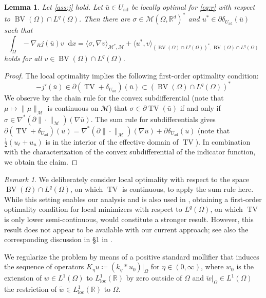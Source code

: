 \documentclass[11pt]{article}
\newcommand{\R}{\mathbb{R}}
\newcommand{\calM}{\mathcal{M}}
\DeclareMathOperator*{\BV}{BV}
\DeclareMathOperator*{\TV}{TV}
\newcommand*\dd{\mathop{}\!\mathrm{d}}
\newcommand{\feas}{U_{\textrm{ad}}}
\newtheorem{lemma}[theorem]{Lemma}
\theoremstyle{definition}
\theoremstyle{remark}
\newtheorem{remark}[theorem]{Remark}
\begin{document}
%
\begin{lemma}
Let \cref{ass:j} hold.
Let $\bar{u} \in \feas$ be locally optimal for \eqref{eq:r}
with respect to $\BV(\Omega) \cap L^{q}(\Omega)$.
Then there are $\sigma \in \calM(\Omega,\R^d)^*$
and $u^* \in \partial \delta_{\feas}(\bar{u})$ such that
%
\[ \int_{\Omega}-\nabla_R j(\bar{u}) v \dd x
= \langle \sigma, \nabla v\rangle_{\calM^*,\calM} 
+ \langle u^*, v \rangle_{(\BV(\Omega) \cap L^{q}(\Omega))^*,\BV(\Omega) \cap L^{q}(\Omega)}
\]
%
holds for all $v \in \BV(\Omega) \cap L^{q}(\Omega)$.
\end{lemma}
\begin{proof}
The local optimality implies the following first-order optimality condition:
%
\[ -j'(\bar{u}) \in \partial (\TV + \delta_{\feas})(\bar{u}) 
   \subset (\BV(\Omega) \cap L^{q}(\Omega))^*
\]
%
We observe by the chain rule for the convex subdifferential (note that $\mu \mapsto \|\mu\|_{\calM}$
is continuous on $\calM$) that
$\sigma \in \partial \TV(\bar{u})$ if and only if
$\sigma \in \nabla^* (\partial \|\cdot\|_{\calM})(\nabla \bar{u})$.
The sum rule for subdifferentials gives 
$\partial (\TV + \delta_{\feas})(\bar{u}) 
= \nabla^* (\partial \|\cdot\|_{\calM})(\nabla \bar{u}) + \partial \delta_{\feas}(\bar{u})$
(note that $\tfrac{1}{2}(u_\ell + u_u)$ is in the interior of the effective domain
of $\TV$). In combination with the characterization of the convex subdifferential of the indicator
function, we obtain the claim.
\end{proof}
\begin{remark}
We deliberately consider local optimality with respect to the space $\BV(\Omega) \cap L^{q}(\Omega)$, on which $\TV$ is continuous, to apply the sum rule
here. While this setting enables our analysis and is also used in \cite{natemeyer2022penalty}, obtaining a first-order optimality condition for local
minimizers with respect to $L^q(\Omega)$, on which $\TV$ is only lower semi-continuous, would constitute a stronger result. However, this result does not appear to be available with our current approach; 
see also the corresponding discussion in \S1 in \cite{clason2018total}.
\end{remark}
%
We regularize the problem by means of a positive standard mollifier that induces
the sequence of operators $K_\eta u \coloneqq (k_\eta * u_0)|_\Omega$ for
$\eta \in (0,\infty)$, where $w_0$ is the extension of $w \in L^1(\Omega)$
to $L^1_{\textrm{loc}}(\R)$ by zero outside of $\Omega$ and
$\tilde{w}|_\Omega \in L^1(\Omega)$
the restriction of $\tilde{w} \in L^1_{\textrm{loc}}(\R)$ to $\Omega$.
\end{document}
